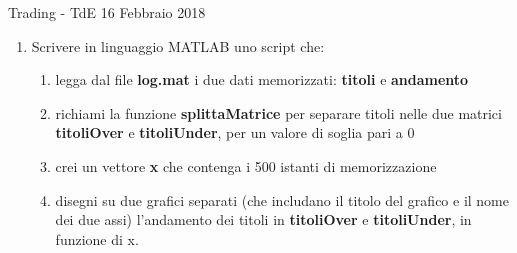 \documentclass[aspectratio=169, ]{beamer}
\begin{document}
\begin{frame}[allowframebreaks]{Trading - TdE 16 Febbraio 2018}
\begin{enumerate}
            \framebreak
        \item Scrivere in linguaggio MATLAB uno script che:
            \begin{enumerate}
                \item legga dal file \textbf{log.mat} i due dati memorizzati: \textbf{titoli} e \textbf{andamento}
                \item richiami la funzione \textbf{splittaMatrice} per separare titoli nelle due matrici \textbf{titoliOver} e \textbf{titoliUnder}, per un valore di soglia pari a 0
                \item crei un vettore \textbf{x} che contenga i 500 istanti di memorizzazione
                \item disegni su due grafici separati (che includano il titolo del grafico e il nome dei due assi) l’andamento dei titoli in \textbf{titoliOver} e \textbf{titoliUnder}, in funzione di x.
            \end{enumerate}
    \end{enumerate}
\end{frame}
\end{document}
